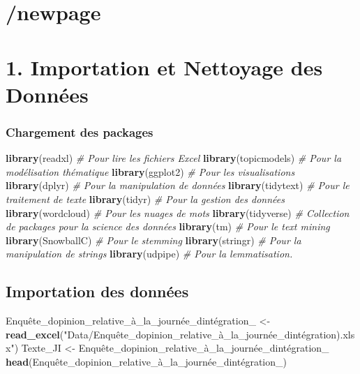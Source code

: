 \documentclass[
]{article}
\newenvironment{Shaded}{\begin{snugshade}}{\end{snugshade}}
\newcommand{\CommentTok}[1]{\textcolor[rgb]{0.56,0.35,0.01}{\textit{#1}}}
\newcommand{\FunctionTok}[1]{\textcolor[rgb]{0.13,0.29,0.53}{\textbf{#1}}}
\newcommand{\NormalTok}[1]{#1}
\newcommand{\OtherTok}[1]{\textcolor[rgb]{0.56,0.35,0.01}{#1}}
\newcommand{\StringTok}[1]{\textcolor[rgb]{0.31,0.60,0.02}{#1}}
\begin{document}
\section{/newpage}\label{newpage}

\section{1. Importation et Nettoyage des
Données}\label{importation-et-nettoyage-des-donnuxe9es}

\subsubsection{Chargement des packages}\label{chargement-des-packages}

\begin{Shaded}
\begin{Highlighting}[]
\FunctionTok{library}\NormalTok{(readxl)       }\CommentTok{\# Pour lire les fichiers Excel}
\FunctionTok{library}\NormalTok{(topicmodels)  }\CommentTok{\# Pour la modélisation thématique}
\FunctionTok{library}\NormalTok{(ggplot2)      }\CommentTok{\# Pour les visualisations}
\FunctionTok{library}\NormalTok{(dplyr)        }\CommentTok{\# Pour la manipulation de données}
\FunctionTok{library}\NormalTok{(tidytext)     }\CommentTok{\# Pour le traitement de texte}
\FunctionTok{library}\NormalTok{(tidyr)        }\CommentTok{\# Pour la gestion des données}
\FunctionTok{library}\NormalTok{(wordcloud)    }\CommentTok{\# Pour les nuages de mots}
\FunctionTok{library}\NormalTok{(tidyverse)    }\CommentTok{\# Collection de packages pour la science des données}
\FunctionTok{library}\NormalTok{(tm)           }\CommentTok{\# Pour le text mining}
\FunctionTok{library}\NormalTok{(SnowballC)    }\CommentTok{\# Pour le stemming}
\FunctionTok{library}\NormalTok{(stringr)      }\CommentTok{\# Pour la manipulation de strings}
\FunctionTok{library}\NormalTok{(udpipe)       }\CommentTok{\# Pour la lemmatisation.}
\end{Highlighting}
\end{Shaded}

\subsection{Importation des données}\label{importation-des-donnuxe9es}

\begin{Shaded}
\begin{Highlighting}[]
\NormalTok{Enquête\_dopinion\_relative\_à\_la\_journée\_dintégration\_ }\OtherTok{\textless{}{-}} \FunctionTok{read\_excel}\NormalTok{(}\StringTok{"Data/Enquête\_dopinion\_relative\_à\_la\_journée\_dintégration).xlsx"}\NormalTok{)}
\NormalTok{Texte\_JI }\OtherTok{\textless{}{-}}\NormalTok{ Enquête\_dopinion\_relative\_à\_la\_journée\_dintégration\_}
\FunctionTok{head}\NormalTok{(Enquête\_dopinion\_relative\_à\_la\_journée\_dintégration\_)}
\end{Highlighting}
\end{Shaded}
\end{document}
